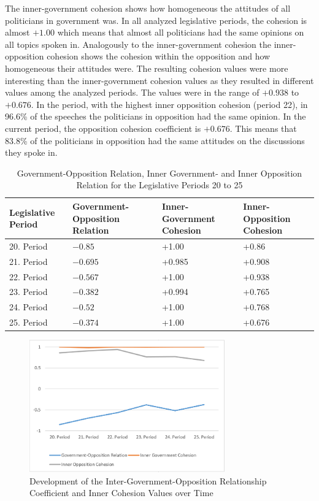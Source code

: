 The inner-government cohesion shows how homogeneous the attitudes of all politicians in government was. In all analyzed legislative periods, the cohesion is almost $+1.00$ which means that almost all politicians had the same opinions on all topics spoken in. Analogously to the inner-government cohesion the inner-opposition cohesion shows the cohesion within the opposition and how homogeneous their attitudes were. The resulting cohesion values were more interesting than the inner-government cohesion values as they resulted in different values among the analyzed periods. The values were in the range of $+0.938$ to $+0.676$. In the period, with the highest inner opposition cohesion (period 22), in 96.6\% of the speeches the politicians in opposition had the same opinion. In the current period, the opposition cohesion coefficient is $+0.676$. This means that 83.8\% of the politicians in opposition had the same attitudes on the discussions they spoke in.

\begin{table}

\centering
\bgroup
\def\arraystretch{1.2}
\begin{tabular}{| p{2cm} | p{3cm} | p{3cm} | p{3cm} |}
\hline
  Legislative Period & Government-Opposition Relation & Inner-Government Cohesion & Inner-Opposition Cohesion \\
\hline
\hline
  20. Period & $-0.85$ & +1.00 & +0.86 \\
\hline
  21. Period & $-0.695$ & +0.985 & +0.908 \\
\hline
  22. Period & $-0.567$ & +1.00 & +0.938 \\
\hline
  23. Period & $-0.382$ & +0.994 & +0.765\\
\hline
  24. Period & $-0.52$ & +1.00 & +0.768\\
\hline
  25. Period & $-0.374$ & +1.00 & +0.676\\
\hline

\end{tabular}
\egroup
\caption{Government-Opposition Relation, Inner Government- and Inner Opposition Relation for the Legislative Periods 20 to 25}
\label{table:gov_opp_relation}
\end{table}

\begin{figure}
\center
	\includegraphics[width=0.75\textwidth]{imgs/gov_opp_rel_graph}
	\caption{Development of the Inter-Government-Opposition Relationship Coefficient and Inner Cohesion Values over Time}
	\label{fig:gov_opp_relation}
\end{figure}